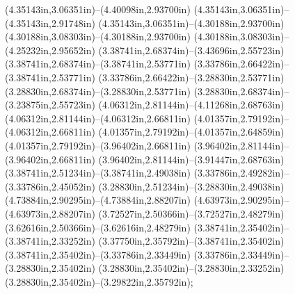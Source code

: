 (4.35143in,3.06351in)--(4.40098in,2.93700in) (4.35143in,3.06351in)--(4.35143in,2.91748in) (4.35143in,3.06351in)--(4.30188in,2.93700in) (4.30188in,3.08303in)--(4.30188in,2.93700in) (4.30188in,3.08303in)--(4.25232in,2.95652in) (3.38741in,2.68374in)--(3.43696in,2.55723in) (3.38741in,2.68374in)--(3.38741in,2.53771in) (3.33786in,2.66422in)--(3.38741in,2.53771in) (3.33786in,2.66422in)--(3.28830in,2.53771in) (3.28830in,2.68374in)--(3.28830in,2.53771in) (3.28830in,2.68374in)--(3.23875in,2.55723in) (4.06312in,2.81144in)--(4.11268in,2.68763in) (4.06312in,2.81144in)--(4.06312in,2.66811in) (4.01357in,2.79192in)--(4.06312in,2.66811in) (4.01357in,2.79192in)--(4.01357in,2.64859in) (4.01357in,2.79192in)--(3.96402in,2.66811in) (3.96402in,2.81144in)--(3.96402in,2.66811in) (3.96402in,2.81144in)--(3.91447in,2.68763in) (3.38741in,2.51234in)--(3.38741in,2.49038in) (3.33786in,2.49282in)--(3.33786in,2.45052in) (3.28830in,2.51234in)--(3.28830in,2.49038in) (4.73884in,2.90295in)--(4.73884in,2.88207in) (4.63973in,2.90295in)--(4.63973in,2.88207in) (3.72527in,2.50366in)--(3.72527in,2.48279in) (3.62616in,2.50366in)--(3.62616in,2.48279in) (3.38741in,2.35402in)--(3.38741in,2.33252in) (3.37750in,2.35792in)--(3.38741in,2.35402in) (3.38741in,2.35402in)--(3.33786in,2.33449in) (3.33786in,2.33449in)--(3.28830in,2.35402in) (3.28830in,2.35402in)--(3.28830in,2.33252in) (3.28830in,2.35402in)--(3.29822in,2.35792in);
